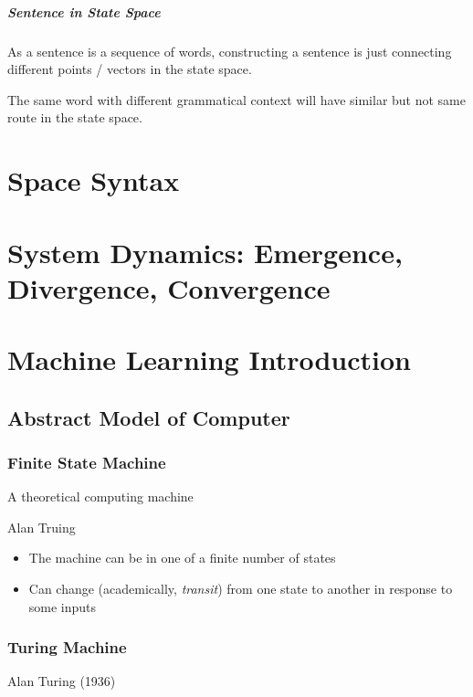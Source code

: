 \documentclass[a4paper, openany]{book}
\begin{document}
\paragraph{Sentence in State Space}

As a sentence is a sequence of words, constructing a sentence is just connecting different points / vectors in the state space.

The same word with different grammatical context will have similar but not same route in the state space.

\chapter{Space Syntax}

\chapter{System Dynamics: Emergence, Divergence, Convergence}

\chapter{Machine Learning Introduction}

\section{Abstract Model of Computer}

\subsection{Finite State Machine}

A theoretical computing machine

Alan Truing

\begin{itemize}
  \item The machine can be in one of a finite number of states
  \item Can change (academically, \emph{transit}) from one state to another in
  response to some inputs
\end{itemize}

\subsection{Turing Machine}

Alan Turing (1936)
\end{document}

